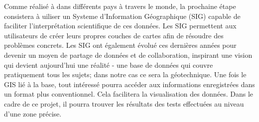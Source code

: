 \par
Comme réalisé à dans différents pays à travers le monde, la prochaine 
étape consistera à uiliser un Systeme d'Information Géographique (SIG) capable de faciliter l'interprétation 
scientifique de ces données. 
Les SIG permettent aux utilisateurs de créer leurs propres couches de cartes 
afin de résoudre des problèmes concrets. Les SIG ont également évolué ces dernières années pour 
devenir un moyen de partage de données et de collaboration, inspirant une 
vision qui devient aujourd’hui une réalité - une base de données qui 
couvre pratiquement tous les sujets; dans notre cas ce sera la géotechnique. 
Une fois le GIS lié à la base, tout intéressé pourra accéder aux informations 
enregistrées dans un format plus conventionnel. Cela facilitera la visualisation des données. 
Dans le cadre de ce projet, il 
pourra trouver les résultats des tests effectuées au niveau d'une zone précise.